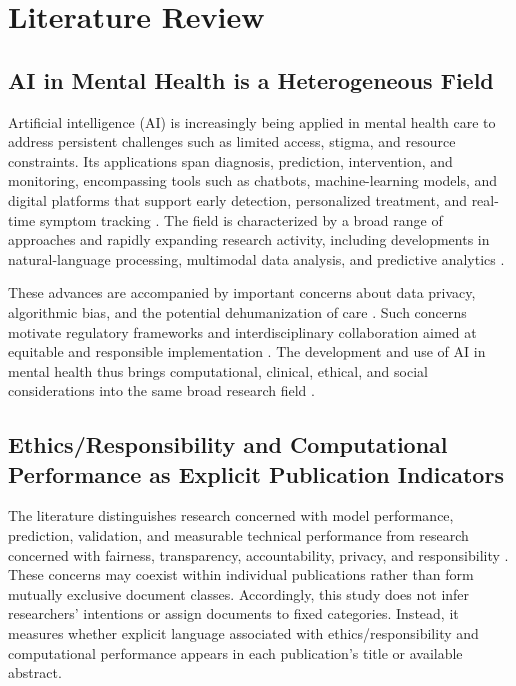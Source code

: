 \documentclass[12pt]{article}
\begin{document}
\section{Literature Review}

\subsection{AI in Mental Health is a Heterogeneous Field}

Artificial intelligence (AI) is increasingly being applied in mental health care to address persistent challenges such as limited access, stigma, and resource constraints. Its applications span diagnosis, prediction, intervention, and monitoring, encompassing tools such as chatbots, machine-learning models, and digital platforms that support early detection, personalized treatment, and real-time symptom tracking \citep{beg2025,raygozal2025,saputra2026}. The field is characterized by a broad range of approaches and rapidly expanding research activity, including developments in natural-language processing, multimodal data analysis, and predictive analytics \citep{pardo2026,elsayary2026,jin2023}.

These advances are accompanied by important concerns about data privacy, algorithmic bias, and the potential dehumanization of care \citep{bansal2026,raygozal2025}. Such concerns motivate regulatory frameworks and interdisciplinary collaboration aimed at equitable and responsible implementation \citep{beg2025,mikaeili2025,riva2025}. The development and use of AI in mental health thus brings computational, clinical, ethical, and social considerations into the same broad research field \citep{maidment2026,carneiro2025,pardo2026}.

\subsection{Ethics/Responsibility and Computational Performance as Explicit Publication Indicators}

The literature distinguishes research concerned with model performance, prediction, validation, and measurable technical performance from research concerned with fairness, transparency, accountability, privacy, and responsibility \citep{mller2017,muoz2008}. These concerns may coexist within individual publications rather than form mutually exclusive document classes. Accordingly, this study does not infer researchers' intentions or assign documents to fixed categories. Instead, it measures whether explicit language associated with ethics/responsibility and computational performance appears in each publication's title or available abstract.
\end{document}
